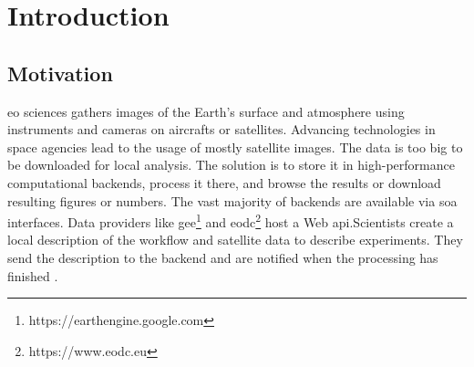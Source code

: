 \documentclass[draft,final]{vutinfth} %
\begin{document}

\tableofcontents %

\mainmatter

\chapter{Introduction}\label{Introduction}


\section{Motivation}\label{Motivation}\label{Use Cases}
\gls{eo} sciences gathers images of the Earth's surface and atmosphere using instruments and cameras on aircrafts or satellites. Advancing technologies in space agencies lead to the usage of mostly satellite images. The data is too big to be downloaded for local analysis. The solution is to store it in high-performance computational backends, process it there, and browse the results or download resulting figures or numbers. The vast majority of backends are available via \gls{soa} interfaces. Data providers like \gls{gee}\footnote{https://earthengine.google.com} and \gls{eodc}\footnote{https://www.eodc.eu} host a Web \gls{api}.Scientists create a local description of the \gls{workflow} and satellite data to describe experiments. They send the description to the \gls{backend} and are notified when the processing has finished \cite{geocloud}. 
\end{document}
